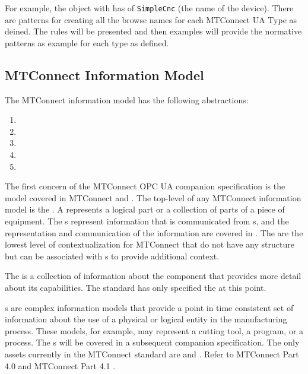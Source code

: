 For example, the object with  has  of \texttt{SimpleCnc} (the name of the device). There are patterns for creating all the browse names for each MTConnect UA Type as deined. The rules will be presented and then examples will provide the normative patterns as example for each type as defined.

\FloatBarrier

\subsection{MTConnect Information Model}

The MTConnect information model has the following abstractions:

\begin{enumerate}
\item {}
\item {}
\item {}
\item {}
\item {}
\end{enumerate}

The first concern of the MTConnect OPC UA companion specification is the  model covered in MTConnect \cite{MTCPart2} and \cite{MTCPart3}. The top-level  of any MTConnect information model is the . A  represents a logical part or a collection of parts of a piece of equipment. The s represent information that is communicated from s, and the representation and communication of the information are covered in \cite{MTCPart3}. The  are the lowest level of contextualization for MTConnect  that do not have any structure but can be associated with s to provide additional context. 

The  is a collection of information about the component that provides more detail about its capabilities. The standard has only specified the  at this point.

s are complex information models that provide a point in time consistent set of information about the use of a physical or logical entity in the manufacturing process. These models, for example, may represent a cutting tool, a program, or a process. The s will be covered in a subsequent companion specification. The only assets currently in the MTConnect standard are  and . Refer to MTConnect Part 4.0 \cite{MTCPart40} and MTConnect Part 4.1 \cite{MTCPart41}.

